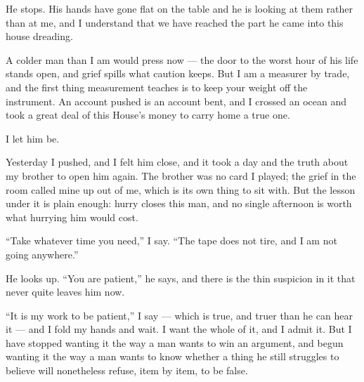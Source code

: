 \ornament

He stops. His hands have gone flat on the table and he is looking at them rather than at me, and I understand that we have reached the part he came into this house dreading.\par

A colder man than I am would press now --- the door to the worst hour of his life stands open, and grief spills what caution keeps. But I am a measurer by trade, and the first thing measurement teaches is to keep your weight off the instrument. An account pushed is an account bent, and I crossed an ocean and took a great deal of this House's money to carry home a true one.\par

I let him be.\par

Yesterday I pushed, and I felt him close, and it took a day and the truth about my brother to open him again. The brother was no card I played; the grief in the room called mine up out of me, which is its own thing to sit with. But the lesson under it is plain enough: hurry closes this man, and no single afternoon is worth what hurrying him would cost.\par

``Take whatever time you need,'' I say. ``The tape does not tire, and I am not going anywhere.''\par

He looks up. ``You are patient,'' he says, and there is the thin suspicion in it that never quite leaves him now.\par

``It is my work to be patient,'' I say --- which is true, and truer than he can hear it --- and I fold my hands and wait. I want the whole of it, and I admit it. But I have stopped wanting it the way a man wants to win an argument, and begun wanting it the way a man wants to know whether a thing he still struggles to believe will nonetheless refuse, item by item, to be false.\par

\ornament

